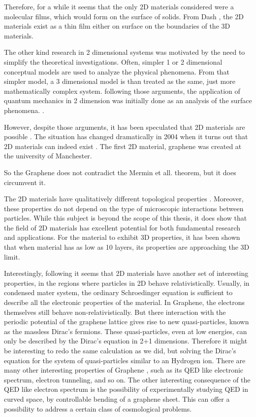 Therefore, for a while it seems that the only 2D materials considered were a molecular films, which would form on the surface of solids. From Dash \cite{2DMatter1}, the 2D materials exist as a thin film either on surface on the boundaries of the 3D materials.

The other kind research in 2 dimensional systems was motivated by the need to simplify the theoretical investigations. Often, simpler 1 or 2 dimensional  conceptual models are used to analyze the physical phenomena. From that simpler model, a 3 dimensional model is than treated as the same, just more mathematically complex system.  following those arguments, the application of  quantum mechanics in 2 dimension was initially done as an analysis of the surface phenomena. \cite{2dfilm}. 

However, despite those arguments, it has been speculated that 2D materials are possible \cite{2DMatter1}. The situation has changed dramatically in 2004 when it turns out that 2D materials can indeed exist \cite{Graphene0}. The first 2D material, graphene was created \cite{GrapheneN} at the university of Manchester.

So the Graphene does not contradict the Mermin et all. theorem, but it does circumvent it.

The 2D materials have qualitatively different topological properties \cite{2DMatterCurvature}. Moreover, these properties do not depend on the type of microscopic interactions between particles. While this subject is beyond the scope of this thesis, it does show that the field of 2D materials has excellent potential for both fundamental research and applications. For the material to exhibit 3D properties, it has been shown \cite{GraphLayers} that when material has as low as 10 layers, its properties are approaching the 3D limit.

Interestingly, following \cite{Graphene0} it seems that 2D materials have another set of interesting properties, in the regions where particles in 2D behave relativistically. Usually, in condensed mater system, the ordinary Schroedinger equation is sufficient to describe all the electronic properties of the material. In Graphene, the electrons themselves still behave non-relativistically. But there interaction with the periodic potential of the graphene lattice gives rise to new quasi-particles, known as the massless Dirac's fermions. These quasi-particles, even at low energies, can only be described by the Dirac's equation in 2+1 dimensions. Therefore it might be interesting to redo the same calculation as we did, but solving the Dirac's equation for the system of quasi-particles similar to an Hydrogen ion.  There are many other interesting properties of Graphene \cite{Graphene0}, such as its QED like electronic spectrum, electron tunneling, and so on. The other interesting consequence of the QED like electron spectrum is the possibility of experimentally studying QED in curved space, by controllable bending of a graphene sheet. This can offer a possibility to address a certain class of cosmological problems. 

